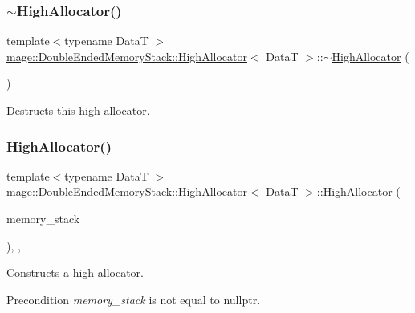 \subsubsection{\texorpdfstring{$\sim$\+High\+Allocator()}{~HighAllocator()}}
{\footnotesize\ttfamily template$<$typename DataT $>$ \\
\hyperlink{structmage_1_1_double_ended_memory_stack_1_1_high_allocator}{mage\+::\+Double\+Ended\+Memory\+Stack\+::\+High\+Allocator}$<$ DataT $>$\+::$\sim$\hyperlink{structmage_1_1_double_ended_memory_stack_1_1_high_allocator}{High\+Allocator} (\begin{DoxyParamCaption}{ }\end{DoxyParamCaption})\hspace{0.3cm}{\ttfamily [default]}}

Destructs this high allocator. \hypertarget{structmage_1_1_double_ended_memory_stack_1_1_high_allocator_a6d51325f813c70290379dcb472d093c3}{}\label{structmage_1_1_double_ended_memory_stack_1_1_high_allocator_a6d51325f813c70290379dcb472d093c3} 
\subsubsection{\texorpdfstring{High\+Allocator()}{HighAllocator()}\hspace{0.1cm}{\footnotesize\ttfamily [4/4]}}
{\footnotesize\ttfamily template$<$typename DataT $>$ \\
\hyperlink{structmage_1_1_double_ended_memory_stack_1_1_high_allocator}{mage\+::\+Double\+Ended\+Memory\+Stack\+::\+High\+Allocator}$<$ DataT $>$\+::\hyperlink{structmage_1_1_double_ended_memory_stack_1_1_high_allocator}{High\+Allocator} (\begin{DoxyParamCaption}\item[{\hyperlink{classmage_1_1_double_ended_memory_stack}{Double\+Ended\+Memory\+Stack} $\ast$}]{memory\+\_\+stack }\end{DoxyParamCaption})\hspace{0.3cm}{\ttfamily [explicit]}, {\ttfamily [private]}, {\ttfamily [noexcept]}}

Constructs a high allocator.

\begin{DoxyPrecond}{Precondition}
{\itshape memory\+\_\+stack} is not equal to {\ttfamily nullptr}. 
\end{DoxyPrecond}

